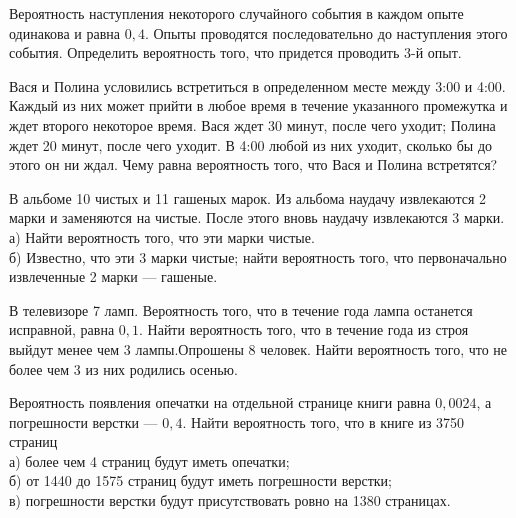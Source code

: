 \newpage\setcounter{zad}{0}



\begin{zkrW}{20}\noindent 
	Вероятность наступления некоторого случайного события в каждом опыте одинакова и равна $0{,}4$. Опыты проводятся последовательно до наступления этого события. Определить вероятность того, что придется проводить 3-й опыт.
 
\end{zkrW}

\begin{zkrW}{20}\noindent 
	Вася и Полина условились встретиться в определенном месте между 3:00 и 4:00. Каждый из них может прийти в любое время в течение указанного промежутка и ждет второго некоторое время. Вася ждет 30 минут, после чего уходит; Полина ждет 20 минут, после чего уходит. В 4:00 любой из них уходит, сколько бы до этого он ни ждал. Чему равна вероятность того, что Вася и Полина встретятся?
 
\end{zkrW}

\begin{zkrW}{20}\noindent 
	В альбоме 10 чистых и 11 гашеных марок. Из альбома наудачу извлекаются 2 марки и заменяются на чистые. После этого вновь наудачу извлекаются 3 марки. \\ \indent а) Найти вероятность того, что эти марки чистые. \\ \indent б) Известно, что эти 3 марки чистые; найти вероятность того, что первоначально извлеченные 2 марки --- гашеные.
 
\end{zkrW}

\begin{zkrW}{20}\noindent 
	В телевизоре 7 ламп. Вероятность того, что в течение года лампа останется исправной, равна $0{,}1$. Найти вероятность того, что в течение года из строя выйдут менее чем 3 лампы.Опрошены 8 человек. Найти вероятность того, что не более чем 3 из них родились осенью.
 
\end{zkrW}

\begin{zkrW}{20}\noindent 
	Вероятность появления опечатки на отдельной странице книги равна $0{,}0024$, а погрешности верстки --- $0{,}4$. Найти вероятность того, что в книге из 3750 страниц \\ \indent а) более чем 4 страниц будут иметь опечатки; \\ \indent б) от 1440 до 1575 страниц будут иметь погрешности верстки; \\ \indent в) погрешности верстки будут присутствовать ровно на 1380 страницах.
 
\end{zkrW}

